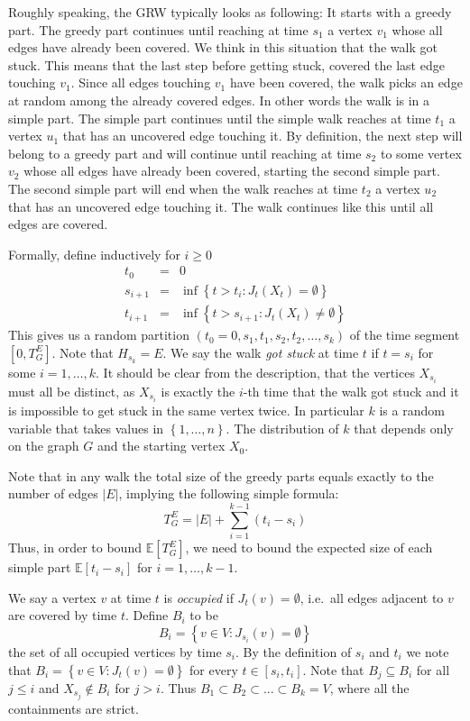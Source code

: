 \documentclass[12pt,a4paper]{article}
\newcommand{\set}[1]{{\left\{#1 \right\}}}
\newcommand{\0}{{\bf 0}}
\newcommand{\seq}{\subseteq}
\newcommand{\E}{{\mathbb E}}
\newcommand{\eqnar}[1]{\begin{eqnarray*}#1\end{eqnarray*}}
\begin{document}
    Roughly speaking, the GRW typically looks as following: It starts with a greedy part. The greedy part continues until
    reaching at time $s_1$ a vertex $v_1$ whose all edges have already been covered.
    We think in this situation that the walk got stuck.
    This means that the last step before getting stuck, covered the last edge touching $v_1$.
    Since all edges touching $v_1$ have been covered, the walk picks an edge at random among the already covered edges.
    In other words the walk is in a simple part.
    The simple part continues until the simple walk reaches at time $t_1$ a vertex $u_1$ that has an uncovered edge touching it.
    By definition, the next step will belong to a greedy part and will continue until reaching at time $s_2$
    to some vertex $v_2$ whose all edges have already been covered, starting the second simple part.
    The second simple part will end when the walk reaches at time $t_2$ a vertex $u_2$ that has an uncovered edge touching it.
    The walk continues like this until all edges are covered.

    Formally, define inductively for $i \geq 0$
    \eqnar{
        t_0 & = & 0 \\
        s_{i+1} & = & \inf  \set{t > t_i : J_t(X_t)  = \emptyset} \\
        t_{i+1} & = & \inf \set{t > s_{i+1} : J_t(X_t)  \neq \emptyset}
    }
    This gives us a random partition $(t_0 = 0,s_1,t_1,s_2,t_2,\dots,s_k)$
    of the time segment $[0, T^E_G]$.
    Note that $H_{s_k} = E$.
    We say the walk \emph{got stuck} at time $t$ if $t = s_i$ for some $i = 1, \dots, k$.
    It should be clear from the description, that the vertices $X_{s_i}$ must all be distinct,
    as $X_{s_i}$ is exactly the $i$-th time that the walk got stuck and it is impossible to get stuck in the same vertex twice.
    In particular $k$ is a random variable that takes values in $\set{1, \dots, n}$.
    The distribution of $k$ that depends only on the graph $G$ and the starting vertex $X_0$.

    Note that in any walk the total size of the greedy parts equals exactly to the number of edges $|E|$,
    implying the following simple formula:
    \begin{equation}
        T^E_G = |E| + \sum_{i=1}^{k-1} (t_i - s_i)
    \end{equation}
    Thus, in order to bound $\E[T^E_G]$, we need to bound the expected size of each simple part $\E[t_i - s_i]$ for $i = 1, \dots, k-1$.

    We say a vertex $v$ at time $t$ is \emph{occupied} if $J_t(v) = \emptyset$,
    i.e.\ all edges adjacent to $v$ are covered by time $t$.
    Define $B_i$ to be
    \[
        B_i = \set{v \in V : J_{s_i}(v) = \emptyset}
    \]
    the set of all occupied vertices by time $s_i$.
    By the definition of $s_i$ and $t_i$ we note that
    $B_i = \set{v \in V : J_{t}(v) = \emptyset}$ for every $t \in [s_i, t_i]$.
    Note that $B_j \seq B_i$ for all $j \leq i$ and $X_{s_j} \notin B_i$ for $j > i$.
    Thus $B_1 \subset B_2 \subset ... \subset B_k = V$, where all the containments are strict.
\end{document}
